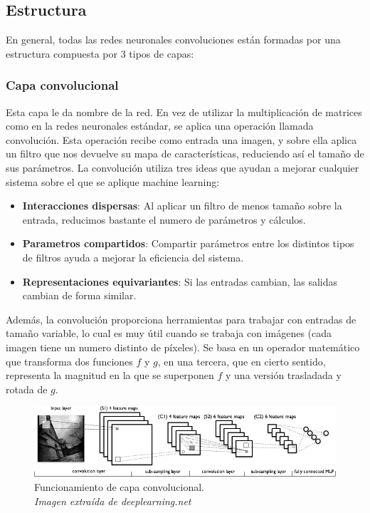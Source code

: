 \subsection{Estructura}
En general, todas las redes neuronales convoluciones están formadas por una estructura compuesta por 3 tipos de capas:
\subsubsection{Capa convolucional}
Esta capa le da nombre de la red. En vez de utilizar la multiplicación de matrices como en la redes neuronales estándar, se aplica una operación llamada convolución. Esta operación recibe como entrada una imagen, y sobre ella aplica un filtro que nos devuelve su mapa de características, reduciendo así el tamaño de sus parámetros. La convolución utiliza tres ideas que ayudan a mejorar cualquier sistema sobre el que se aplique machine learning:
\begin{itemize}
\item{\textbf{Interacciones dispersas}:}
Al aplicar un filtro de menos tamaño sobre la entrada, reducimos bastante el numero de parámetros y cálculos.
\item{\textbf{Parametros compartidos}:}
Compartir parámetros entre los distintos tipos de filtros ayuda a mejorar la eficiencia del sistema.
\item{\textbf{Representaciones equivariantes}:}
Si las entradas cambian, las salidas cambian de forma similar.
\end{itemize}
Además, la convolución proporciona herramientas para trabajar con entradas de tamaño variable, lo cual es muy útil cuando se trabaja con imágenes (cada imagen tiene un numero distinto de píxeles). Se basa en un operador matemático que transforma dos funciones ${f}$ y ${g}$, en una tercera, que en cierto sentido, representa la magnitud en la que se superponen ${f}$ y una versión trasladada y rotada de ${g}$.
\begin{figure}[htp]
\centering
\includegraphics[scale=0.7]{images/conv_layer.png}
\caption{Funcionamiento de capa convolucional.\\\textit{Imagen extraída de deeplearning.net}}
\end{figure}\\
